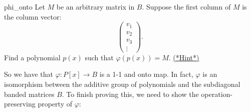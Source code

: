 \begin{exercise}{phi_onto}
Let $M$ be an arbitrary matrix in $B$. Suppose the first column of $M$ is the column vector:
\[\left(\begin{array}{c}v_1\\v_2\\v_3\\\vdots\end{array}\right).\] 
Find a polynomial $p(x)$ such that $\varphi(p(x)) = M$. \hyperref[sec:PolyVec:hints]{(*Hint*)} 
\end{exercise}
So we have that $\varphi:P[x]\to B$ is a 1-1 and onto map. In fact, $\varphi$ is an isomorphism between the additive group of polynomials   and the subdiagonal banded matrices $B$. To finish proving this, we need to show the operation-preserving property of $\varphi$:

